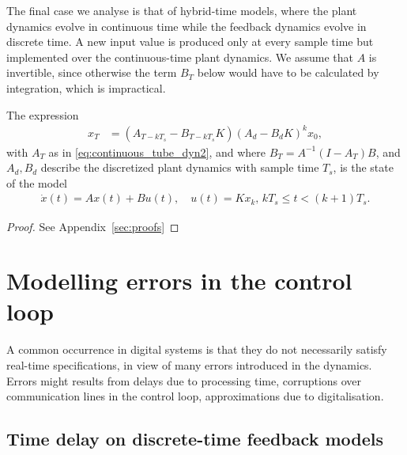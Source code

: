 \documentclass[sigconf]{llncs}
\newcommand{\mat}[1]{{#1}}
\renewcommand{\vec}[1]{{#1}}
\begin{document}
The final case we analyse is that of hybrid-time models, 
where the plant dynamics evolve in continuous time while the feedback dynamics evolve in discrete time.  
A new input value is produced only at every sample time but implemented over the continuous-time plant dynamics. 
We assume that $\mat{A}$ is invertible, since otherwise the term $B_T$ below would have to be calculated by integration, which is impractical.

%
\begin{theorem}
The expression
 \begin{align}
 \vec{x}_{T} &= (\mat{A}_{T-kT_s}-\mat{B}_{T-kT_s}\mat{K}) (\mat{A}_d-\mat{B}_d\mat{K})^k\vec{x}_0, 
 \label{eq:cyber_feedback}
 \end{align}
 with $\mat{A}_T$ as in \eqref{eq:continuous_tube_dyn2}, 
 and where $\mat{B}_T=\mat{A}^{-1}(\mat{I}-\mat{A}_T)\mat{B}$, 
 and $\mat{A}_d, \mat{B}_d$ describe the discretized plant dynamics with sample time $T_s$, 
 is the state of the model 
 \begin{align}
 \dot{\vec{x}}(t) = \mat{A}\vec{x}(t)+\mat{B}\vec{u}(t), \quad 
 \vec{u}(t)=\mat{K}\vec{x}_k,  \,
 kT_s \leq t < (k+1)T_s. 
 \end{align}
 \end{theorem}
\begin{proof}
See Appendix~\ref{sec:proofs}
\end{proof}

\section{Modelling errors in the control loop}\label{sec:errors}

A common occurrence in digital systems is that they do not necessarily satisfy real-time specifications, 
in view of many errors introduced in the dynamics. 
Errors might results from delays due to processing time,
corruptions over communication lines in the control loop, 
approximations due to digitalisation.  

\subsection{Time delay on discrete-time feedback models} \label{sec:delay}
\end{document}

